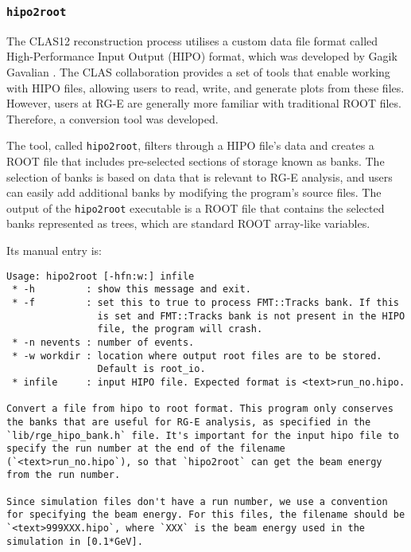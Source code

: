 \subsubsection{\texttt{hipo2root}}
\label{13.11::hipo2root}
    The CLAS12 reconstruction process utilises a custom data file format called High-Performance Input Output (HIPO) format, which was developed by Gagik Gavalian \cite{chekanov2021}.
    The CLAS collaboration provides a set of tools that enable working with HIPO files, allowing users to read, write, and generate plots from these files.
    However, users at RG-E are generally more familiar with traditional ROOT files. Therefore, a conversion tool was developed.

    The tool, called \texttt{hipo2root}, filters through a HIPO file's data and creates a ROOT file that includes pre-selected sections of storage known as banks.
    The selection of banks is based on data that is relevant to RG-E analysis, and users can easily add additional banks by modifying the program's source files.
    The output of the \texttt{hipo2root} executable is a ROOT file that contains the selected banks represented as trees, which are standard ROOT array-like variables.

    Its manual entry is:
    \begin{lstlisting}
Usage: hipo2root [-hfn:w:] infile
 * -h         : show this message and exit.
 * -f         : set this to true to process FMT::Tracks bank. If this
                is set and FMT::Tracks bank is not present in the HIPO
                file, the program will crash.
 * -n nevents : number of events.
 * -w workdir : location where output root files are to be stored.
                Default is root_io.
 * infile     : input HIPO file. Expected format is <text>run_no.hipo.

Convert a file from hipo to root format. This program only conserves the banks that are useful for RG-E analysis, as specified in the `lib/rge_hipo_bank.h` file. It's important for the input hipo file to specify the run number at the end of the filename (`<text>run_no.hipo`), so that `hipo2root` can get the beam energy from the run number.

Since simulation files don't have a run number, we use a convention for specifying the beam energy. For this files, the filename should be `<text>999XXX.hipo`, where `XXX` is the beam energy used in the simulation in [0.1*GeV].
    \end{lstlisting}
